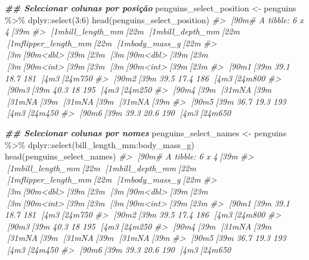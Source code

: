 \documentclass[
]{book}
\newenvironment{Shaded}{\begin{snugshade}}{\end{snugshade}}
\newcommand{\CommentTok}[1]{\textcolor[rgb]{0.37,0.37,0.37}{\textit{#1}}}
\newcommand{\DecValTok}[1]{\textcolor[rgb]{0.06,0.06,0.06}{#1}}
\newcommand{\DocumentationTok}[1]{\textcolor[rgb]{0.37,0.37,0.37}{\textbf{\textit{#1}}}}
\newcommand{\FunctionTok}[1]{\textcolor[rgb]{0,0,0}{#1}}
\newcommand{\NormalTok}[1]{#1}
\newcommand{\OtherTok}[1]{\textcolor[rgb]{0.37,0.37,0.37}{#1}}
\newcommand{\SpecialCharTok}[1]{\textcolor[rgb]{0,0,0}{#1}}
\begin{document}
\begin{Shaded}
\begin{Highlighting}[]
\DocumentationTok{\#\# Selecionar colunas por posição}
\NormalTok{penguins\_select\_position }\OtherTok{\textless{}{-}}\NormalTok{ penguins }\SpecialCharTok{\%\textgreater{}\%} 
\NormalTok{  dplyr}\SpecialCharTok{::}\FunctionTok{select}\NormalTok{(}\DecValTok{3}\SpecialCharTok{:}\DecValTok{6}\NormalTok{)}
\FunctionTok{head}\NormalTok{(penguins\_select\_position)}
\CommentTok{\#\textgreater{} [90m\# A tibble: 6 x 4[39m}
\CommentTok{\#\textgreater{}   [1mbill\_length\_mm[22m [1mbill\_depth\_mm[22m [1mflipper\_length\_mm[22m [1mbody\_mass\_g[22m}
\CommentTok{\#\textgreater{}            [3m[90m\textless{}dbl\textgreater{}[39m[23m         [3m[90m\textless{}dbl\textgreater{}[39m[23m             [3m[90m\textless{}int\textgreater{}[39m[23m       [3m[90m\textless{}int\textgreater{}[39m[23m}
\CommentTok{\#\textgreater{} [90m1[39m           39.1          18.7               181        [4m3[24m750}
\CommentTok{\#\textgreater{} [90m2[39m           39.5          17.4               186        [4m3[24m800}
\CommentTok{\#\textgreater{} [90m3[39m           40.3          18                 195        [4m3[24m250}
\CommentTok{\#\textgreater{} [90m4[39m           [31mNA[39m            [31mNA[39m                  [31mNA[39m          [31mNA[39m}
\CommentTok{\#\textgreater{} [90m5[39m           36.7          19.3               193        [4m3[24m450}
\CommentTok{\#\textgreater{} [90m6[39m           39.3          20.6               190        [4m3[24m650}

\DocumentationTok{\#\# Selecionar colunas por nomes}
\NormalTok{penguins\_select\_names }\OtherTok{\textless{}{-}}\NormalTok{ penguins }\SpecialCharTok{\%\textgreater{}\%} 
\NormalTok{  dplyr}\SpecialCharTok{::}\FunctionTok{select}\NormalTok{(bill\_length\_mm}\SpecialCharTok{:}\NormalTok{body\_mass\_g)}
\FunctionTok{head}\NormalTok{(penguins\_select\_names)}
\CommentTok{\#\textgreater{} [90m\# A tibble: 6 x 4[39m}
\CommentTok{\#\textgreater{}   [1mbill\_length\_mm[22m [1mbill\_depth\_mm[22m [1mflipper\_length\_mm[22m [1mbody\_mass\_g[22m}
\CommentTok{\#\textgreater{}            [3m[90m\textless{}dbl\textgreater{}[39m[23m         [3m[90m\textless{}dbl\textgreater{}[39m[23m             [3m[90m\textless{}int\textgreater{}[39m[23m       [3m[90m\textless{}int\textgreater{}[39m[23m}
\CommentTok{\#\textgreater{} [90m1[39m           39.1          18.7               181        [4m3[24m750}
\CommentTok{\#\textgreater{} [90m2[39m           39.5          17.4               186        [4m3[24m800}
\CommentTok{\#\textgreater{} [90m3[39m           40.3          18                 195        [4m3[24m250}
\CommentTok{\#\textgreater{} [90m4[39m           [31mNA[39m            [31mNA[39m                  [31mNA[39m          [31mNA[39m}
\CommentTok{\#\textgreater{} [90m5[39m           36.7          19.3               193        [4m3[24m450}
\CommentTok{\#\textgreater{} [90m6[39m           39.3          20.6               190        [4m3[24m650}


\end{Highlighting}
\end{Shaded}
\end{document}
